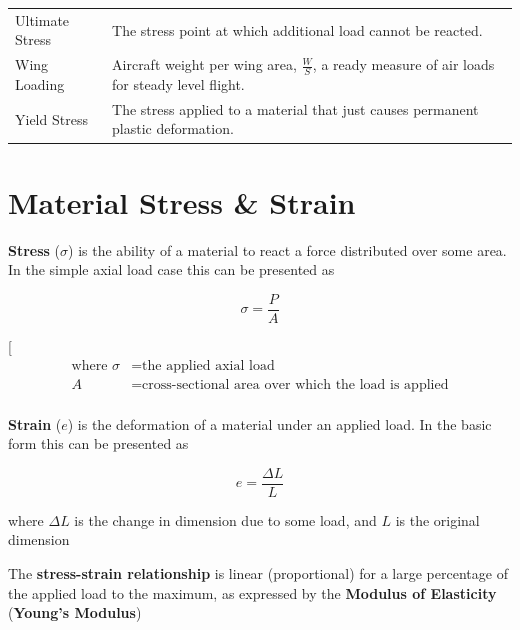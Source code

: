 \documentclass[
]{book}
\begin{document}
\begin{longtable}[]{@{}ll@{}}
\begin{minipage}[t]{0.14\columnwidth}
Ultimate Stress\strut
\end{minipage} & \begin{minipage}[t]{0.80\columnwidth}\raggedright
The stress point at which additional load cannot be reacted.\strut
\end{minipage}\tabularnewline
\begin{minipage}[t]{0.14\columnwidth}\raggedright
Wing Loading\strut
\end{minipage} & \begin{minipage}[t]{0.80\columnwidth}\raggedright
Aircraft weight per wing area, \(\frac{W}{S}\), a ready measure of air loads for steady level flight.\strut
\end{minipage}\tabularnewline
\begin{minipage}[t]{0.14\columnwidth}\raggedright
Yield Stress\strut
\end{minipage} & \begin{minipage}[t]{0.80\columnwidth}\raggedright
The stress applied to a material that just causes permanent plastic deformation.\strut
\end{minipage}\tabularnewline
\bottomrule
\end{longtable}

\hypertarget{material-stress-strain}{%
\section{Material Stress \& Strain}\label{material-stress-strain}}

\textbf{Stress} (\(\sigma\)) is the ability of a material to react a force distributed over some area. In the simple axial load case this can be presented as

\[
  \sigma = \frac{P}{A}
\]

{[}
\begin{align}
  \text{where } \sigma &= \text{the applied axial load} \\
  A &= \text{cross-sectional area over which the load is applied} \\
  \end{align}

\textbf{Strain} (\(e\)) is the deformation of a material under an applied load. In the basic form this can be presented as

\[
  e = \frac{\Delta L}{L}
\]

where \(\Delta L\) is the change in dimension due to some load, and \(L\) is the original dimension

The \textbf{stress-strain relationship} is linear (proportional) for a large percentage of the applied load to the maximum, as expressed by the \textbf{Modulus of Elasticity} (\textbf{Young's Modulus})
\end{document}
